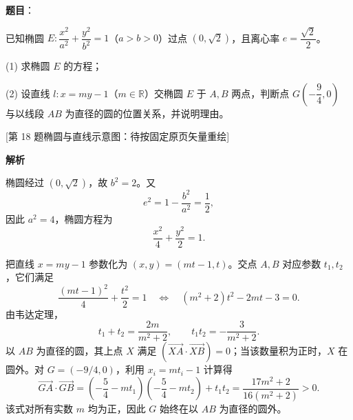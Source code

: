 \begin{answer}

\textbf{题目}：

已知椭圆 $E:\dfrac{x^2}{a^2}+\dfrac{y^2}{b^2}=1$（$a>b>0$）过点 $(0,\sqrt2)$，且离心率 $e=\dfrac{\sqrt2}{2}$。

(1) 求椭圆 $E$ 的方程；

(2) 设直线 $l:x=my-1$（$m\in\mathbb{R}$）交椭圆 $E$ 于 $A,B$ 两点，判断点 $G\!\left(-\dfrac94,0\right)$ 与以线段 $AB$ 为直径的圆的位置关系，并说明理由。

[第 18 题椭圆与直线示意图：待按固定原页矢量重绘]

\textbf{解析}


椭圆经过 $(0,\sqrt2)$，故 $b^2=2$。又
\nopagebreak[4]
\[
e^2=1-\frac{b^2}{a^2}=\frac12,
\]
因此 $a^2=4$，椭圆方程为
\nopagebreak[4]
\[
\frac{x^2}{4}+\frac{y^2}{2}=1.
\]


把直线 $x=my-1$ 参数化为 $(x,y)=(mt-1,t)$。交点 $A,B$ 对应参数 $t_1,t_2$，它们满足
\nopagebreak[4]
\[
\frac{(mt-1)^2}{4}+\frac{t^2}{2}=1
\quad\Longleftrightarrow\quad
(m^2+2)t^2-2mt-3=0.
\]
由韦达定理，
\nopagebreak[4]
\[
t_1+t_2=\frac{2m}{m^2+2},\qquad
t_1t_2=-\frac3{m^2+2}.
\]
以 $AB$ 为直径的圆，其上点 $X$ 满足
$(\overrightarrow{XA}\cdot\overrightarrow{XB})=0$；当该数量积为正时，$X$ 在圆外。对 $G=(-9/4,0)$，利用 $x_i=mt_i-1$ 计算得
\nopagebreak[4]
\[
\overrightarrow{GA}\cdot\overrightarrow{GB}
=\left(-\frac54-mt_1\right)\left(-\frac54-mt_2\right)+t_1t_2
=\frac{17m^2+2}{16(m^2+2)}>0.
\]
该式对所有实数 $m$ 均为正，因此 $G$ 始终在以 $AB$ 为直径的圆外。



\end{answer}
